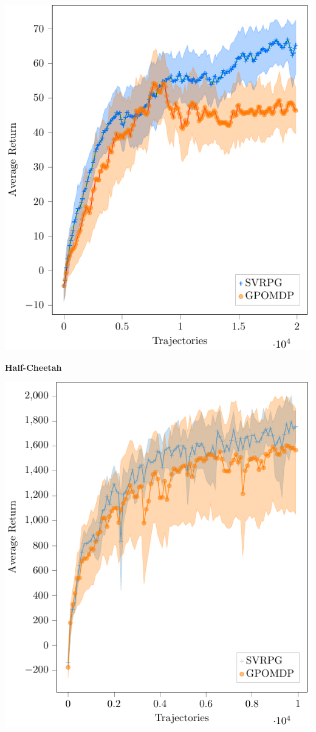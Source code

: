 \documentclass[aspectratio=169]{beamer}
\begin{document}
\begin{frame}
\begin{minipage}[]{.28\paperwidth}
\includegraphics[width=\textwidth]{images/swimmer.pdf}
\end{minipage}
%
\begin{minipage}[]{.28\paperwidth}
\begin{center}
	\textbf{Half-Cheetah}
\end{center}
\includegraphics[width=\textwidth]{images/cheetah.pdf}
\end{minipage}


\end{frame}
\end{document}
